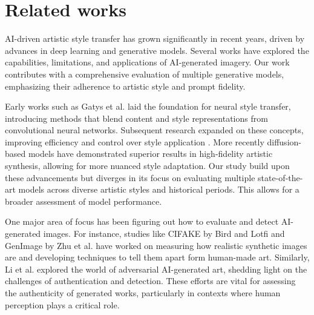 \section{Related works}
AI-driven artistic style transfer has grown significantly in recent years, driven by advances in deep learning and generative models. Several works have explored the capabilities, limitations, and applications of AI-generated imagery. Our work contributes with a comprehensive evaluation of multiple generative models, emphasizing their adherence to artistic style and prompt fidelity.

Early works such as Gatys et al. \cite{Gatys_neural_representation} laid the foundation for neural style transfer, introducing methods that blend content and style representations from convolutional neural networks. Subsequent research expanded on these concepts, improving efficiency and control over style application \cite{Huang_style_transfer_normalization}. More recently diffusion-based models have demonstrated superior results in high-fidelity artistic synthesis, allowing for more nuanced style adaptation. Our study build upon these advancements but diverges in its focus on evaluating multiple state-of-the-art models across diverse artistic styles and historical periods. This allows for a broader assessment of model performance. 

One major area of focus has been figuring out how to evaluate and detect AI-generated images. For instance, studies like CIFAKE by Bird and Lotfi \cite{cifake} and GenImage by Zhu et al. \cite{genimage} have worked on measuring how realistic synthetic images are and developing techniques to tell them apart form human-made art. Similarly, Li et al. \cite{AIart} explored the world of adversarial AI-generated art, shedding light on the challenges of authentication and detection. These efforts are vital for assessing the authenticity of generated works, particularly in contexts where human perception plays a critical role. 

